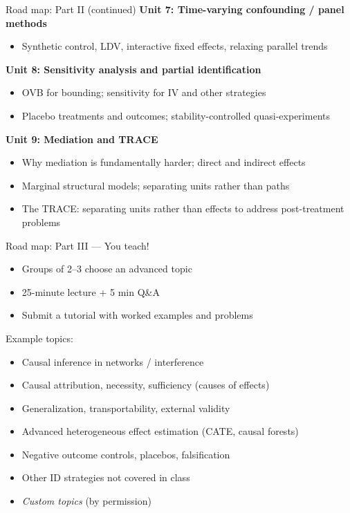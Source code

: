 \documentclass[xcolor=dvipsnames]{beamer}
\begin{document}
\begin{frame}{Road map: Part II (continued)}
\small
\textbf{Unit 7: Time-varying confounding / panel methods}\\
\footnotesize
\begin{itemize}
\item Synthetic control, LDV, interactive fixed effects, relaxing parallel trends
\end{itemize}
\medskip
\small
\textbf{Unit 8: Sensitivity analysis and partial identification}\\
\footnotesize
\begin{itemize}
\item OVB for bounding; sensitivity for IV and other strategies
\item Placebo treatments and outcomes; stability-controlled quasi-experiments
\end{itemize}
\medskip
\small
\textbf{Unit 9: Mediation and TRACE}\\
\footnotesize
\begin{itemize}
\item Why mediation is fundamentally harder; direct and indirect effects
\item Marginal structural models; separating units rather than paths
\item The TRACE: separating units rather than effects to address post-treatment problems
\end{itemize}
\end{frame}

\begin{frame}{Road map: Part III --- You teach!}
\small
\begin{itemize}
\item Groups of 2--3 choose an advanced topic
\item 25-minute lecture + 5 min Q\&A
\item Submit a tutorial with worked examples and problems
\end{itemize}

 Example topics:\\
\footnotesize
\begin{itemize}
\item Causal inference in networks / interference
\item Causal attribution, necessity, sufficiency (causes of effects)
\item Generalization, transportability, external validity
\item Advanced heterogeneous effect estimation (CATE, causal forests)
\item Negative outcome controls, placebos, falsification
\item Other ID strategies not covered in class
\item \textit{Custom topics} (by permission)
\end{itemize}
\end{frame}
\end{document}
